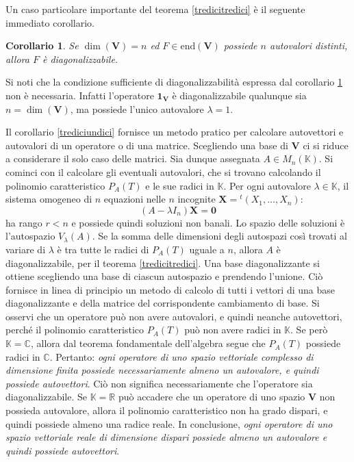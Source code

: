 \documentclass{article}
\theoremstyle{plain}
\newtheorem{cor}{Corollario}
\theoremstyle{definition}
\theoremstyle{remark}
\begin{document}
\vspace{10pt}

Un caso particolare importante del teorema \ref{tredicitredici} è il seguente immediato corollario.

\vspace{10pt}

\begin{bxthm}
\begin{cor}\label{trediciquattordici}
    Se $\dim(\mathbf{V}) = n$ ed $F \in \mathrm{end}(\mathbf{V})$ possiede $n$ autovalori distinti, allora $F$ è diagonalizzabile.
\end{cor}
\end{bxthm}

\vspace{10pt}

Si noti che la condizione sufficiente di diagonalizzabilità espressa dal corollario \ref{trediciquattordici} non è necessaria. 
Infatti l'operatore $\mathbf{1_V}$ è diagonalizzabile qualunque sia $n = \dim(\mathbf{V})$, ma possiede l'unico autovalore $\lambda = 1$.

\vspace{10pt}

Il corollario \ref{trediciundici} fornisce un metodo pratico per calcolare autovettori e autovalori di un operatore o di una matrice. 
Scegliendo una base di $\mathbf{V}$ ci si riduce a considerare il solo caso delle matrici. Sia dunque assegnata $A \in M_n(\mathbb{K})$. 
Si cominci con il calcolare gli eventuali autovalori, che si trovano calcolando il polinomio caratteristico $P_A(T)$ e le sue radici 
in $\mathbb{K}$. Per ogni autovalore $\lambda \in \mathbb{K}$, il sistema omogeneo di $n$ equazioni nelle 
$n$ incognite $\mathbf{X} = {}^t(X_1, \ldots, X_n)$:
\[(A - \lambda I_n) \mathbf{X} = \mathbf{0}\]
ha rango $r < n$ e possiede quindi soluzioni non banali. Lo spazio delle soluzioni è l'autospazio $V_\lambda(A)$. 
Se la somma delle dimensioni degli autospazi così trovati al variare di $\lambda$ è tra tutte le radici di $P_A(T)$ uguale a $n$, allora $A$ è diagonalizzabile, 
per il teorema \ref{tredicitredici}. Una base diagonalizzante si ottiene scegliendo una base di ciascun autospazio e prendendo l'unione.
Ciò fornisce in linea di principio un metodo di calcolo di tutti i vettori di una base diagonalizzante e della matrice del corrispondente cambiamento di base. 
Si osservi che un operatore può non avere autovalori, e quindi neanche autovettori, perché il polinomio caratteristico $P_A(T)$ può non avere radici 
in $\mathbb{K}$. Se però $\mathbb{K}=\mathbb{C}$, allora dal teorema fondamentale dell'algebra segue che $P_A(T)$ possiede radici in 
$\mathbb{C}$. Pertanto: \emph{ogni operatore di uno spazio vettoriale complesso di dimensione finita possiede necessariamente almeno un autovalore, e 
quindi possiede autovettori}. Ciò non significa necessariamente che l'operatore sia diagonalizzabile. 
Se $\mathbb{K} = \mathbb{R}$ può accadere che un operatore di uno spazio $\mathbf{V}$ non possieda autovalore, allora il polinomio caratteristico non ha 
grado dispari, e quindi possiede almeno una radice reale. In conclusione, \emph{ogni operatore di uno spazio vettoriale reale di dimensione dispari possiede almeno un autovalore 
e quindi possiede autovettori}.
\end{document}

